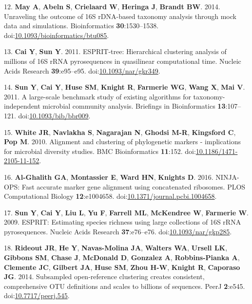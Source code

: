 \documentclass[11pt,]{article}
\begin{document}
\hypertarget{ref-May2014}{}
12. \textbf{May A}, \textbf{Abeln S}, \textbf{Crielaard W},
\textbf{Heringa J}, \textbf{Brandt BW}. 2014. Unraveling the outcome of
16S rDNA-based taxonomy analysis through mock data and simulations.
Bioinformatics \textbf{30}:1530--1538.
doi:\href{https://doi.org/10.1093/bioinformatics/btu085}{10.1093/bioinformatics/btu085}.

\hypertarget{ref-Cai2011}{}
13. \textbf{Cai Y}, \textbf{Sun Y}. 2011. ESPRIT-tree: Hierarchical
clustering analysis of millions of 16S rRNA pyrosequences in quasilinear
computational time. Nucleic Acids Research \textbf{39}:e95--e95.
doi:\href{https://doi.org/10.1093/nar/gkr349}{10.1093/nar/gkr349}.

\hypertarget{ref-Sun2011}{}
14. \textbf{Sun Y}, \textbf{Cai Y}, \textbf{Huse SM}, \textbf{Knight R},
\textbf{Farmerie WG}, \textbf{Wang X}, \textbf{Mai V}. 2011. A
large-scale benchmark study of existing algorithms for
taxonomy-independent microbial community analysis. Briefings in
Bioinformatics \textbf{13}:107--121.
doi:\href{https://doi.org/10.1093/bib/bbr009}{10.1093/bib/bbr009}.

\hypertarget{ref-White2010}{}
15. \textbf{White JR}, \textbf{Navlakha S}, \textbf{Nagarajan N},
\textbf{Ghodsi M-R}, \textbf{Kingsford C}, \textbf{Pop M}. 2010.
Alignment and clustering of phylogenetic markers - implications for
microbial diversity studies. BMC Bioinformatics \textbf{11}:152.
doi:\href{https://doi.org/10.1186/1471-2105-11-152}{10.1186/1471-2105-11-152}.

\hypertarget{ref-AlGhalith2016}{}
16. \textbf{Al-Ghalith GA}, \textbf{Montassier E}, \textbf{Ward HN},
\textbf{Knights D}. 2016. NINJA-OPS: Fast accurate marker gene alignment
using concatenated ribosomes. PLOS Computational Biology
\textbf{12}:e1004658.
doi:\href{https://doi.org/10.1371/journal.pcbi.1004658}{10.1371/journal.pcbi.1004658}.

\hypertarget{ref-Sun2009}{}
17. \textbf{Sun Y}, \textbf{Cai Y}, \textbf{Liu L}, \textbf{Yu F},
\textbf{Farrell ML}, \textbf{McKendree W}, \textbf{Farmerie W}. 2009.
ESPRIT: Estimating species richness using large collections of 16S rRNA
pyrosequences. Nucleic Acids Research \textbf{37}:e76--e76.
doi:\href{https://doi.org/10.1093/nar/gkp285}{10.1093/nar/gkp285}.

\hypertarget{ref-Rideout2014}{}
18. \textbf{Rideout JR}, \textbf{He Y}, \textbf{Navas-Molina JA},
\textbf{Walters WA}, \textbf{Ursell LK}, \textbf{Gibbons SM},
\textbf{Chase J}, \textbf{McDonald D}, \textbf{Gonzalez A},
\textbf{Robbins-Pianka A}, \textbf{Clemente JC}, \textbf{Gilbert JA},
\textbf{Huse SM}, \textbf{Zhou H-W}, \textbf{Knight R}, \textbf{Caporaso
JG}. 2014. Subsampled open-reference clustering creates consistent,
comprehensive OTU definitions and scales to billions of sequences. PeerJ
\textbf{2}:e545.
doi:\href{https://doi.org/10.7717/peerj.545}{10.7717/peerj.545}.
\end{document}
